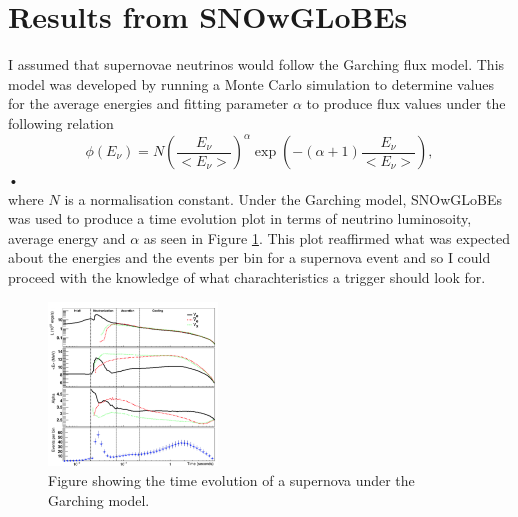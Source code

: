 \documentclass[a4paper,12,oneside,notitlepage]{report}
\begin{document}
\section*{\fontsize{11}{11}\selectfont Results from SNOwGLoBEs}
I assumed that supernovae neutrinos would follow the Garching flux model. This model was developed by running a Monte Carlo simulation to determine values for the average energies and fitting parameter $\alpha$ to produce flux values under the following relation
\begin{equation}
\phi(E_{\nu}) = N \left( \frac{E_{\nu}}{<E_{\nu}>} \right)^\alpha \exp \left( -(\alpha + 1) \frac{E_{\nu}}{<E_{\nu}>} \right),
\end{equation}•
\\where $N$ is a normalisation constant. Under the Garching model, SNOwGLoBEs was used to produce a time evolution plot in terms of neutrino luminosoity, average energy and $\alpha$ as seen in Figure  \ref{fig:SnowglobesPlot1}. This plot reaffirmed what was expected about the energies and the events per bin for a supernova event and so I could proceed with the knowledge of what charachteristics a trigger should look for.
\begin{figure} [H]
\begin{center}
\includegraphics[width=0.4\textwidth]{SnowglobesPlot1.png}
\caption{Figure showing the time evolution of a supernova under the Garching model.  \label{fig:SnowglobesPlot1}}
\end{center}
\end{figure}
\end{document}
